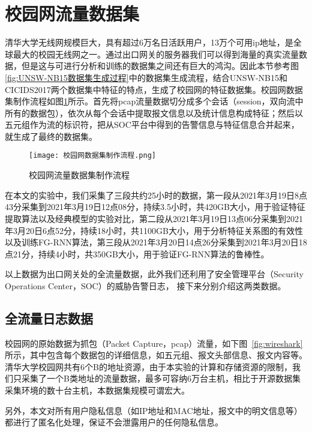 \section{校园网流量数据集}
清华大学无线网规模巨大，具有超过6万名日活跃用户，13万个可用ip地址，是全球最大的校园无线网之一。通过出口网关的服务器我们可以得到海量的真实流量数据，但是这与可进行分析和训练的数据集之间还有巨大的鸿沟。因此本节参考图\ref{fig:UNSW-NB15数据集生成过程}中的数据集生成流程，结合UNSW-NB15和CICIDS2017两个数据集中特征的特点，生成了校园网的特征数据集。校园网数据集制作流程如图\ref{fig:流量数据集制作流程}所示。首先将pcap流量数据切分成多个会话（session，双向流中所有的数据包），依次从每个会话中提取报文信息以及统计信息构成特征；然后以五元组作为流的标识符，把从SOC平台中得到的告警信息与特征信息合并起来，就生成了最终的数据集。
\begin{figure}
    \centering
    \texttt{[image: 校园网数据集制作流程.png]}
    \caption{校园网流量数据集制作流程}
    \label{fig:流量数据集制作流程}
  \end{figure}

在本文的实验中，我们采集了三段共约25小时的数据，第一段从2021年3月19日8点43分采集到2021年3月19日12点08分，持续3.5小时，共420GB大小，用于验证特征提取算法以及经典模型的实验对比，第二段从2021年3月19日13点06分采集到2021年3月20日6点52分，持续18小时，共1100GB大小，用于分析特征关系图的有效性以及训练FG-RNN算法，第三段从2021年3月20日14点26分采集到2021年3月20日18点21分，持续4小时，共350GB大小，用于验证FG-RNN算法的鲁棒性。

以上数据为出口网关处的全流量数据，此外我们还利用了安全管理平台（Security Operations Center，SOC）的威胁告警日志，
接下来分别介绍这两类数据。

\subsection{全流量日志数据}
校园网的原始数据为抓包（Packet Capture，pcap）流量，如下图~\ref{fig:wireshark}所示，其中包含每个数据包的详细信息，如五元组、报文头部信息、报文内容等。清华大学校园网共有6个B的地址资源，由于本实验的计算和存储资源的限制，我们只采集了一个B类地址的流量数据，最多可容纳6万台主机，相比于开源数据集采集环境的数十台主机，本数据集规模可谓宏大。

另外，本文对所有用户隐私信息（如IP地址和MAC地址，报文中的明文信息等）都进行了匿名化处理，保证不会泄露用户的任何隐私信息。

